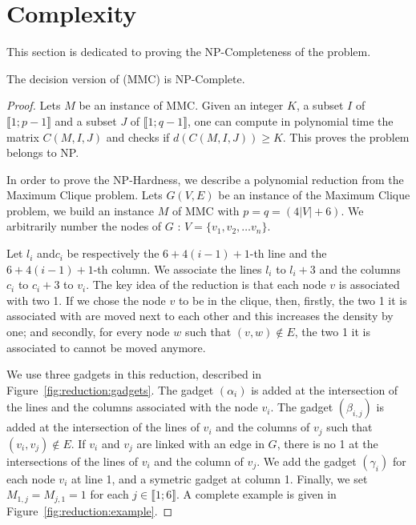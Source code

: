\section{Complexity}
\label{sect:complexity}
 
This section is dedicated to proving the NP-Completeness of the problem.

  \begin{theorem}
  \label{theo:complexity}
  The decision version of (MMC) is NP-Complete.
  \end{theorem}
  \begin{proof}
 

    Lets $M$ be an instance of MMC. Given an integer $K$, a subset $I$ of $\llbracket 1; p-1 \rrbracket$ and a subset $J$ of $\llbracket 1; q-1 \rrbracket$, one can compute in polynomial time the matrix $C(M,I,J)$ and checks if $d(C(M,I,J)) \geq K$. This proves the problem belongs to NP.

    In order to prove the NP-Hardness, we describe a polynomial reduction from the Maximum Clique problem. Lets $G(V,E)$ be an instance of the Maximum Clique problem, we build an instance $M$ of MMC with $p = q = (4|V| + 6)$. We arbitrarily number the nodes of $G$ : $V = \{v_1, v_2, \dots v_n\}$.

    Let $l_i$ and$c_i$ be respectively the $6+4(i-1)+1$-th line and the $6+4(i-1)+1$-th column. We associate the lines $l_i$ to $l_i+3$ and the columns $c_i$ to $c_i + 3$ to $v_i$. The key idea of the reduction is that each node $v$ is associated with two 1. If we chose the node $v$ to be in the clique, then, firstly, the two 1 it is associated with are moved next to each other and this increases the density by one; and secondly, for every node $w$ such that $(v,w) \not\in E$, the two 1 it is associated to cannot be moved anymore.

    We use three gadgets in this reduction, described in Figure~\ref{fig:reduction:gadgets}. The gadget $(\alpha_i)$ is added at the intersection of the lines and the columns associated with the node $v_i$. The gadget $(\beta_{i,j})$ is added at the intersection of the lines of $v_i$ and the columns of $v_j$ such that $(v_i,v_j) \not\in E$. If $v_i$ and $v_j$ are linked with an edge in $G$, there is no 1 at the intersections of the lines of $v_i$ and the column of $v_j$. We add the gadget $(\gamma_i)$ for each node $v_i$ at line 1, and a symetric gadget at column 1. Finally, we set $M_{1,j} = M_{j,1} = 1$ for each $j \in \llbracket 1;6 \rrbracket$. A complete example is given in Figure~\ref{fig:reduction:example}.


\end{proof}
